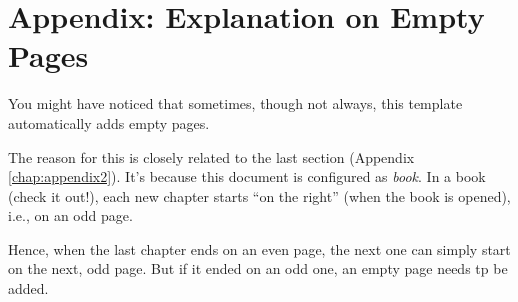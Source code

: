 \chapter{Appendix: Explanation on Empty Pages}\label{chap:appendix3}

You might have noticed that sometimes, though not always, this template automatically adds empty pages. 

The reason for this is closely related to the last section (Appendix \ref{chap:appendix2}). It's because this document is configured as \emph{book}. In a book (check it out!), each new chapter starts ``on the right'' (when the book is opened), i.e., on an odd page. 

Hence, when the last chapter ends on an even page, the next one can simply start on the next, odd page. But if it ended on an odd one, an empty page needs tp be added.